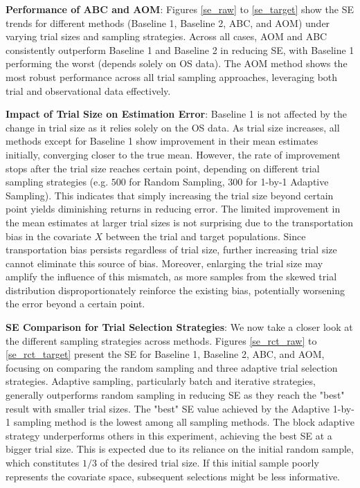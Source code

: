 \documentclass[12pt, oneside]{amsart}
\theoremstyle{definition}
\theoremstyle{remark}
\numberwithin{equation}{section}
\begin{document}
\textbf{Performance of ABC and AOM}: Figures \ref{se_raw} to \ref{se_target} show the SE trends for different methods (Baseline 1, Baseline 2, ABC, and AOM) under varying trial sizes and sampling strategies. Across all cases, AOM and ABC consistently outperform Baseline 1 and Baseline 2 in reducing SE, with Baseline 1 performing the worst (depends solely on OS data). The AOM method shows the most robust performance across all trial sampling approaches, leveraging both trial and observational data effectively. 

\textbf{Impact of Trial Size on Estimation Error}: Baseline 1 is not affected by the change in trial size as it relies solely on the OS data. As trial size increases, all methods except for Baseline 1 show improvement in their mean estimates initially, converging closer to the true mean. However, the rate of improvement stops after the trial size reaches certain point, depending on different trial sampling strategies (e.g. $500$ for Random Sampling, $300$ for 1-by-1 Adaptive Sampling). This indicates that simply increasing the trial size beyond certain point yields diminishing returns in reducing error. The limited improvement in the mean estimates at larger trial sizes is not surprising due to the transportation bias in the covariate $X$ between the trial and target populations. Since transportation bias persists regardless of trial size, further increasing trial size cannot eliminate this source of bias. Moreover, enlarging the trial size may amplify the influence of this mismatch, as more samples from the skewed trial distribution disproportionately reinforce the existing bias, potentially worsening the error beyond a certain point.

\textbf{SE Comparison for Trial Selection Strategies}: We now take a closer look at the different sampling strategies across methods. Figures \ref{se_rct_raw} to \ref{se_rct_target} present the SE for Baseline 1, Baseline 2, ABC, and AOM, focusing on comparing the random sampling and three adaptive trial selection strategies. Adaptive sampling, particularly batch and iterative strategies, generally outperforms random sampling in reducing SE as they reach the "best" result with smaller trial sizes. The "best" SE value achieved by the Adaptive 1-by-1 sampling method is the lowest among all sampling methods. The block adaptive strategy underperforms others in this experiment, achieving the best SE at a bigger trial size. This is expected due to its reliance on the initial random sample, which constitutes $1/3$ of the desired trial size. If this initial sample poorly represents the covariate space, subsequent selections might be less informative. \\
\end{document}
